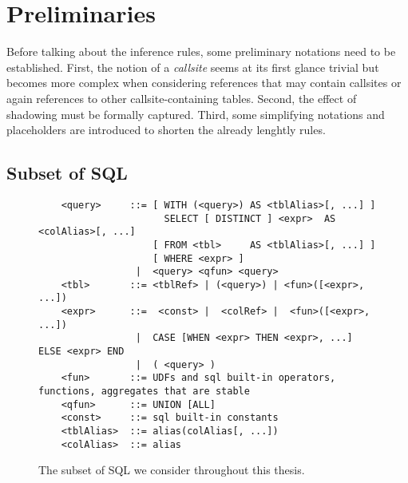 \chapter{Preliminaries}\label{approach}

Before talking about the inference rules, some preliminary notations need to be established. First, the notion of a \textit{callsite} seems at its first glance trivial but becomes more complex when considering references that may contain callsites or again references to other callsite-containing tables. Second, the effect of shadowing must be formally captured. Third, some simplifying notations and placeholders are introduced to shorten the already lenghtly rules.

\section{Subset of SQL}
%
%


\begin{figure}[H]
    \begin{verbatim}
    <query>     ::= [ WITH (<query>) AS <tblAlias>[, ...] ]
                      SELECT [ DISTINCT ] <expr>  AS <colAlias>[, ...]
                    [ FROM <tbl>     AS <tblAlias>[, ...] ]
                    [ WHERE <expr> ]
                 |  <query> <qfun> <query>
    <tbl>       ::= <tblRef> | (<query>) | <fun>([<expr>, ...])
    <expr>      ::=  <const> |  <colRef> |  <fun>([<expr>, ...])
                 |  CASE [WHEN <expr> THEN <expr>, ...] ELSE <expr> END
                 |  ( <query> )
    <fun>       ::= UDFs and sql built-in operators, functions, aggregates that are stable
    <qfun>      ::= UNION [ALL]
    <const>     ::= sql built-in constants
    <tblAlias>  ::= alias(colAlias[, ...])
    <colAlias>  ::= alias
    \end{verbatim}
    \caption{The subset of SQL we consider throughout this thesis.}
    \label{lst:sql_grammar}
\end{figure}


